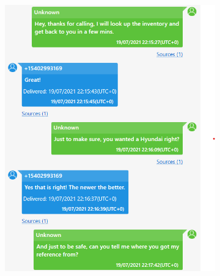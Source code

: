 \documentclass[12pt]{article}
\begin{document}
\begin{figure}[!ht]
    \centering
    \begin{subfigure}[b]{0.3\textwidth}
        \centering
        \includegraphics[width=\textwidth]{images/ss1.png}
        \caption{}
    \end{subfigure}
    \hspace{2 pt}
    \begin{subfigure}[b]{0.3\textwidth}
        \centering

\end{subfigure}
\end{figure}
\end{document}
